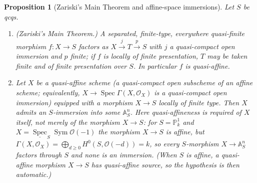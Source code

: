 \documentclass[11pt]{article}
\theoremstyle{plain}
\newtheorem{proposition}[theorem]{Proposition}
\theoremstyle{definition}
\begin{document}
\begin{proposition}[Zariski's Main Theorem and affine-space immersions]
\label{prop:nagata-sketch-zmt}
Let $S$ be qcqs.
\begin{enumerate}\itemsep2pt
\item[(i)] \emph{(Zariski's Main Theorem.)}  A separated, finite-type,
everywhere quasi-finite morphism $f:X\to S$ factors as
$X\xrightarrow{j}T\xrightarrow{p}S$ with $j$ a quasi-compact open immersion
and $p$ finite; if $f$ is locally of finite presentation, $T$ may be taken
finite and of finite presentation over $S$.  In particular $f$ is
quasi-affine.
\item[(ii)] Let $X$ be a quasi-affine \emph{scheme} (a quasi-compact
open subscheme of an affine scheme; equivalently,
$X\to\operatorname{Spec}\Gamma(X,\mathcal O_X)$ is a quasi-compact open
immersion) equipped with a morphism $X\to S$ locally of finite type.
Then $X$ admits an $S$-immersion into some $\mathbb A^n_S$.  Here
quasi-affineness is required of $X$ itself, not merely of the morphism
$X\to S$: for $S=\mathbb P^1_k$ and
$X=\underline{\operatorname{Spec}}_S\operatorname{Sym}\mathcal O(-1)$ the
morphism $X\to S$ is affine, but
$\Gamma(X,\mathcal O_X)=\bigoplus_{d\ge0}H^0(S,\mathcal O(-d))=k$, so every
$S$-morphism $X\to\mathbb A^n_S$ factors through $S$ and none is an
immersion.  (When $S$ is affine, a quasi-affine morphism $X\to S$ has
quasi-affine source, so the hypothesis is then automatic.)
\end{enumerate}
\end{proposition}
\end{document}
